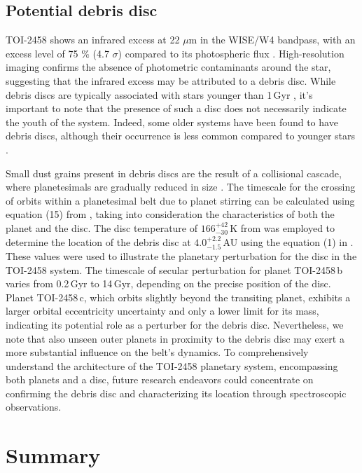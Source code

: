 \documentclass[traditabstract,longauth]{aa}
\begin{document}
\subsection{Potential debris disc}\label{sec:debris}

TOI-2458 shows an infrared excess at 22 $\mu$m in the WISE/W4 bandpass,
with an excess level of 75 $\%$ (4.7 $\sigma$) compared to its
photospheric flux \citep{cruzsaenz14}. High-resolution imaging confirms the absence of photometric contaminants around the star, suggesting that the infrared excess may be attributed to a debris disc. While debris discs are typically associated with stars younger than 1\,Gyr \citep[e.g.,][]{siegler07, gaspar09, mizuki24}, it's important to note that the presence of such a disc does not necessarily indicate the youth of the system. Indeed, some older systems have been found to have debris discs, although their occurrence is less common compared to younger stars \citep[e.g.,][]{Trilling08}.

Small dust grains present in debris discs are the result of a collisional cascade, where planetesimals are gradually reduced in size \citep{wyatt08}. The timescale for the crossing of orbits within a planetesimal belt due to planet stirring can be calculated using equation (15) from \cite{mustillwyatt09}, taking into consideration the characteristics of both the planet and the disc. The disc temperature of $166_{-30}^{+42}$\,K from \cite{cruzsaenz14} was employed to determine the location of the debris disc at $4.0_{-1.5}^{+2.2}$\,AU using the equation (1) in \cite{Trilling08}. These values were used to illustrate the planetary perturbation for the disc in the TOI-2458 system. The timescale of secular perturbation for planet TOI-2458\,b varies from 0.2\,Gyr to 14\,Gyr, depending on the precise position of the disc. Planet TOI-2458\,c, which orbits slightly beyond the transiting planet, exhibits a larger orbital eccentricity uncertainty and only a lower limit for its mass, indicating its potential role as a perturber for the debris disc. Nevertheless, we note that also unseen outer planets in proximity to the debris disc may exert a more substantial influence on the belt's dynamics. To comprehensively understand the architecture of the TOI-2458 planetary system, encompassing both planets and a disc, future research endeavors could concentrate on confirming the debris disc and characterizing its location through spectroscopic observations.

\section{Summary} \label{sec:summary}
\end{document}
